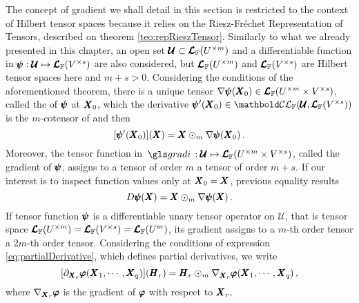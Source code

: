 The concept of gradient we shall detail in this section is restricted to the context of Hilbert tensor spaces because it relies on the Riesz-Fr\'echet Representation of Tensors, described on theorem \ref{teo:repRieszTensor}. Similarly to what we already presented in this chapter, an open set $\pmb{\mathcal{U}}\subset\pmb{\mathcal{L}}_{\mathbb{F}}(U^{\times m})$ and a differentiable function in $\pmb{\psi} : \pmb{\mathcal{U}} \mapsto \pmb{\mathcal{L}}_{\mathbb{F}}(V^{\times s})$ are also considered, but $\pmb{\mathcal{L}}_{\mathbb{F}}(U^{\times m})$ and $\pmb{\mathcal{L}}_{\mathbb{F}}(V^{\times s})$ are Hilbert tensor spaces here and $m+s>0$. Considering the conditions of the aforementioned theorem, there is a unique tensor $\nabla\pmb{\psi}(\pmb{X}_0)\in\pmb{\mathcal{L}}_{\mathbb{F}}(U^{\times m}\times V^{\times s})$, called the  of $\pmb{\psi}$ at $\pmb{X}_0$, which the derivative $\fua{\tnr{\psi}'}{\tnr{X}_0}\in\evlc{\cam{F}}{\pmb{\mathcal{U}}}{\ete{\cam{F}}{V^{\times s}}}$ is the $m$-cotensor of and then
\begin{equation}\label{eq:defGradient}
[\pmb{\psi}'(\pmb{X}_0)](\pmb{X}) = \pmb{X}\odot_m\nabla\pmb{\psi}(\pmb{X}_0)\,.
\end{equation}
Moreover, the tensor function in $\map{\gloref{gradi}}{\pmb{\mathcal{U}}}{\ete{\cam{F}}{U^{\times m}\times V^{\times s}}}$, called the gradient of $\pmb{\psi}$, assigns to a tensor of order $m$ a tensor of order $m+s$. If our interest is to inspect function values only at $\pmb{X}_0=\pmb{X}$, previous equality results
\begin{equation}\label{eq:derivSameArg}
D\pmb{\psi}(\pmb{X}) = \pmb{X}\odot_m\nabla\pmb{\psi}(\pmb{X})\,.
\end{equation}
If tensor function $\pmb{\psi}$ is a differentiable unary tensor operator on $\pmb{\mathcal{U}}$, that is tensor space $\pmb{\mathcal{L}}_{\mathbb{F}}(U^{\times m})=\pmb{\mathcal{L}}_{\mathbb{F}}(V^{\times s})=\pmb{\mathcal{L}}_{\mathbb{F}}(U^{m})$, its gradient assigns to a $m$-th order tensor a $2m$-th order tensor. Considering the conditions of expression \eqref{eq:partialDerivative}, which defines partial derivatives, we write 
\begin{equation}\label{eq:partialGrad}
[\partial_{\pmb{X}_r}\pmb{\varphi}(\pmb{X}_1,\cdots,\pmb{X}_q)]{(\pmb{H}_r)}=\pmb{H}_r\odot_m\nabla_{\pmb{X}_r}\pmb{\varphi}(\pmb{X}_1,\cdots,\pmb{X}_q)\,,
\end{equation}
where $\nabla_{\pmb{X}_r}\pmb{\varphi}$ is the gradient of $\pmb{\varphi}$ with respect to $\pmb{X}_r$. 


